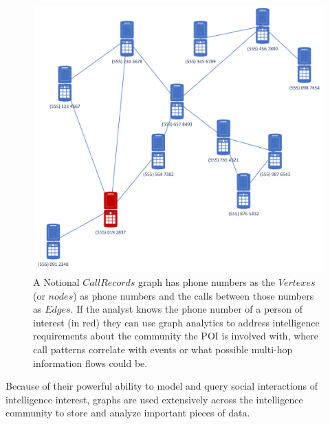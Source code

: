 \documentclass[letterpaper, 10pt]{article}
\begin{document}
\begin{multicols}{2}
        \begin{figure}
            \centering
            \includegraphics[width=\columnwidth]{Papers/ARLIS_MPR_MN/Figures/PhoneRecords.png}
            \caption{A Notional $CallRecords$ graph has phone numbers as the $Vertexes$ (or $nodes$) as phone numbers and the calls between those numbers as $Edges$. If the analyst knows the phone number of a person of interest (in red) they can use graph analytics to address intelligence requirements about the community the POI is involved with, where call patterns correlate with events or what possible multi-hop information flows could be.}
            \label{fig:callRecords}
        \end{figure}
        
        Because of their powerful ability to model and query social interactions of intelligence interest, graphs are used extensively across the intelligence community to store and analyze important pieces of data. 


\end{multicols}
\end{document}
